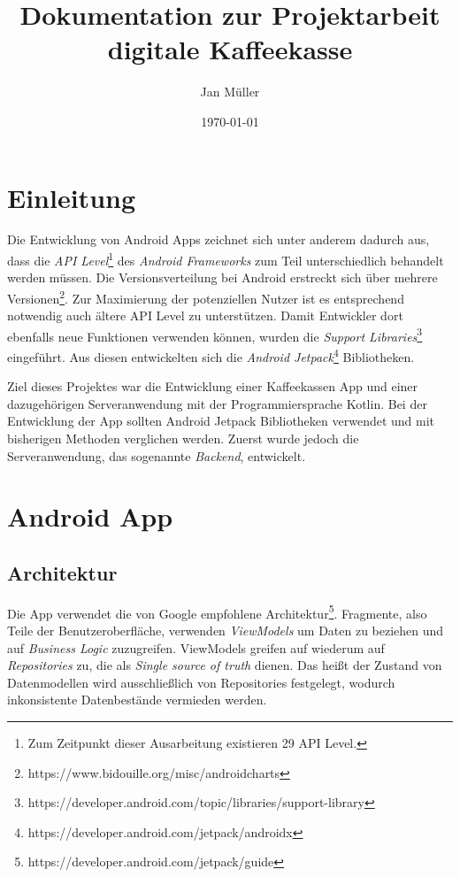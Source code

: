 \documentclass[a4paper, 11pt]{article}
\title{Dokumentation zur Projektarbeit digitale Kaffeekasse}
\author{Jan Müller}
\date{\today}
\begin{document}
\maketitle

\section{Einleitung}
\label{sec:intro}

Die Entwicklung von Android Apps zeichnet sich unter anderem dadurch aus, dass die \textit{API Level}\footnote{Zum Zeitpunkt dieser Ausarbeitung existieren 29 API Level.} des \textit{Android Frameworks} zum Teil unterschiedlich behandelt werden müssen.
Die Versionsverteilung bei Android erstreckt sich über mehrere Versionen\footnote{https://www.bidouille.org/misc/androidcharts}.
Zur Maximierung der potenziellen Nutzer ist es entsprechend notwendig auch ältere API Level zu unterstützen.
Damit Entwickler dort ebenfalls neue Funktionen verwenden können, wurden die \textit{Support Libraries}\footnote{https://developer.android.com/topic/libraries/support-library} eingeführt.
Aus diesen entwickelten sich die \textit{Android Jetpack}\footnote{https://developer.android.com/jetpack/androidx} Bibliotheken.

Ziel dieses Projektes war die Entwicklung einer Kaffeekassen App und einer dazugehörigen Serveranwendung mit der Programmiersprache Kotlin.
Bei der Entwicklung der App sollten Android Jetpack Bibliotheken verwendet und mit bisherigen Methoden verglichen werden.
Zuerst wurde jedoch die Serveranwendung, das sogenannte \textit{Backend}, entwickelt.

\section{Android App}
\label{sec:app}

\subsection{Architektur}
\label{subsec:app:architecture}

Die App verwendet die von Google empfohlene Architektur\footnote{https://developer.android.com/jetpack/guide}.
Fragmente, also Teile der Benutzeroberfläche, verwenden \textit{ViewModels} um Daten zu beziehen und auf \textit{Business Logic} zuzugreifen.
ViewModels greifen auf wiederum auf \textit{Repositories} zu, die als \textit{Single source of truth} dienen.
Das heißt der Zustand von Datenmodellen wird ausschließlich von Repositories festgelegt, wodurch inkonsistente Datenbestände vermieden werden.
\end{document}
